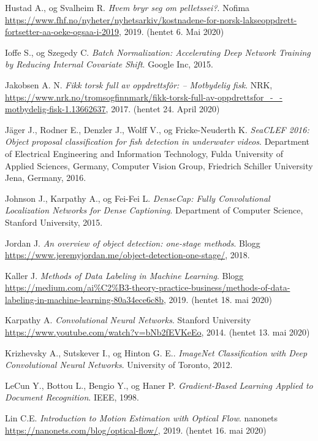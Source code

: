 \documentclass[11ot]{article}
\begin{document}
\begin{thebibliography}{9}
Hustad A., og Svalheim R.
\textit{Hvem bryr seg om pelletssei?}. 
Nofima \url{https://www.fhf.no/nyheter/nyhetsarkiv/kostnadene-for-norsk-lakseoppdrett-fortsetter-aa-oeke-ogsaa-i-2019}, 2019. (hentet 6. Mai 2020)

Ioffe S., og Szegedy C. 
\textit{Batch Normalization: Accelerating Deep Network Training by Reducing Internal Covariate Shift}. 
Google Inc, 2015.

Jakobsen A. N.
\textit{Fikk torsk full av oppdrettsfôr: – Motbydelig fisk}. 
NRK, \url{https://www.nrk.no/tromsogfinnmark/fikk-torsk-full-av-oppdrettsfor_-_-motbydelig-fisk-1.13662637}, 2017. (hentet 24. April 2020)

Jäger J., Rodner E., Denzler J., Wolff V., og Fricke-Neuderth K. 
\textit{SeaCLEF 2016: Object proposal classification for fish detection in underwater videos}. 
Department of Electrical Engineering and Information Technology, Fulda University of Applied Sciences, Germany, Computer Vision Group, Friedrich Schiller University Jena, Germany, 2016.

Johnson J., Karpathy A., og Fei-Fei L. 
\textit{DenseCap: Fully Convolutional Localization Networks for Dense Captioning}. 
Department of Computer Science, Stanford University, 2015.

Jordan J.
\textit{An overview of object detection: one-stage methods}. 
Blogg \url{https://www.jeremyjordan.me/object-detection-one-stage/}, 2018.

Kaller J. 
\textit{Methods of Data Labeling in Machine Learning}. 
Blogg \url{https://medium.com/ai%C2%B3-theory-practice-business/methods-of-data-labeling-in-machine-learning-80a34ece6c8b}, 2019. (hentet 18. mai 2020)

Karpathy A. 
\textit{Convolutional Neural Networks}. 
Stanford University \url{https://www.youtube.com/watch?v=bNb2fEVKeEo}, 2014. (hentet 13. mai 2020)

Krizhevsky A., Sutskever  I., og Hinton G. E.. 
\textit{ImageNet Classification with Deep Convolutional Neural Networks}. 
University of Toronto, 2012.

LeCun Y., Bottou L., Bengio Y., og Haner P. 
\textit{Gradient-Based Learning Applied to Document Recognition}. 
IEEE, 1998.

Lin C.E. 
\textit{Introduction to Motion Estimation with Optical Flow}. 
nanonets \url{https://nanonets.com/blog/optical-flow/}, 2019. (hentet 16. mai 2020)


\end{thebibliography}
\end{document}
